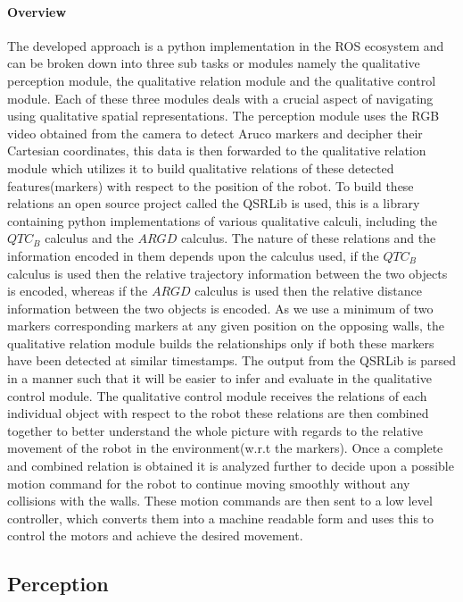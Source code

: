 \paragraph{Overview}The developed approach is a python implementation in the ROS ecosystem and can be broken down into three sub tasks or modules namely the qualitative perception module, the qualitative relation module and the qualitative control module. Each of these three modules deals with a crucial aspect of navigating using qualitative spatial representations. The perception module uses the RGB video obtained from the camera to detect Aruco markers and decipher their Cartesian coordinates, this data is then forwarded to the qualitative relation module which utilizes it to build qualitative relations of these detected features(markers) with respect to the position of the robot. To build these relations an open source project called the QSRLib is used, this is a library containing python implementations of various qualitative calculi, including the $QTC_B$ calculus and the $ARGD$ calculus.  The nature of these relations and the information encoded in them depends upon the calculus used, if the $QTC_B$ calculus is used then the relative trajectory information between the two objects is encoded, whereas if the $ARGD$ calculus is used then the relative distance information between the two objects is encoded. As we use a minimum of two markers corresponding markers at any given position on the opposing walls, the qualitative relation module builds the relationships only if both these markers have been detected at similar timestamps. The output from the QSRLib is parsed in a manner such that it will be easier to infer and evaluate in the qualitative control module. The qualitative control module receives the relations of each individual object with respect to the robot these relations are then combined together to better understand the whole picture with regards to the relative movement of the robot in the environment(w.r.t the markers). Once a complete and combined relation is obtained it is analyzed further to decide upon a possible motion command for the robot to continue moving smoothly without any collisions with the walls. These motion commands are then sent to a low level controller, which converts them into a machine readable form and uses this to control the motors and achieve the desired movement.

\subsection{Perception}
